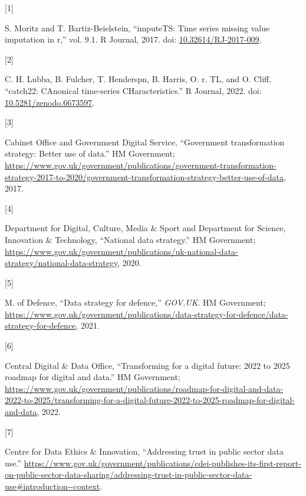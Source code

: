 \documentclass{article}
\newlength{\cslhangindent}
\newlength{\csllabelwidth}
\newlength{\cslentryspacingunit} %
\newenvironment{CSLReferences}[2] %
 {%
  \setlength{\parindent}{0pt}
  \ifodd #1
  \let\oldpar\par
  \def\par{\hangindent=\cslhangindent\oldpar}
  \fi
  \setlength{\parskip}{#2\cslentryspacingunit}
 }%
 {}
\newcommand{\CSLLeftMargin}[1]{\parbox[t]{\csllabelwidth}{#1}}
\newcommand{\CSLRightInline}[1]{\parbox[t]{\linewidth - \csllabelwidth}{#1}\break}
\begin{document}
\hypertarget{refs}{}
\begin{CSLReferences}{0}{0}
\leavevmode{}%
\CSLLeftMargin{{[}1{]} }
\CSLRightInline{S. Moritz and T. Bartiz-Beielstein, {``imputeTS: Time
series missing value imputation in r,''} vol. 9.1. R Journal, 2017. doi:
\href{https://doi.org/10.32614/RJ-2017-009}{10.32614/RJ-2017-009}.}

\leavevmode{}%
\CSLLeftMargin{{[}2{]} }
\CSLRightInline{C. H. Lubba, B. Fulcher, T. Henderspn, B. Harris, O. r.
TL, and O. Cliff, {``catch22: CAnonical time-series CHaracteristics.''}
R Journal, 2022. doi:
\href{https://doi.org/10.5281/zenodo.6673597}{10.5281/zenodo.6673597}.}

\leavevmode{}%
\CSLLeftMargin{{[}3{]} }
\CSLRightInline{Cabinet Office and Government Digital Service,
{``Government transformation strategy: Better use of data.''} HM
Government;
\url{https://www.gov.uk/government/publications/government-transformation-strategy-2017-to-2020/government-transformation-strategy-better-use-of-data},
2017.}

\leavevmode{}%
\CSLLeftMargin{{[}4{]} }
\CSLRightInline{Department for Digital, Culture, Media \& Sport and
Department for Science, Innovation \& Technology, {``National data
strategy.''} HM Government;
\url{https://www.gov.uk/government/publications/uk-national-data-strategy/national-data-strategy},
2020.}

\leavevmode{}%
\CSLLeftMargin{{[}5{]} }
\CSLRightInline{M. of Defence, {``Data strategy for defence,''}
\emph{GOV.UK}. HM Government;
\url{https://www.gov.uk/government/publications/data-strategy-for-defence/data-strategy-for-defence},
2021.}

\leavevmode{}%
\CSLLeftMargin{{[}6{]} }
\CSLRightInline{Central Digital \& Data Office, {``Transforming for a
digital future: 2022 to 2025 roadmap for digital and data.''} HM
Government;
\url{https://www.gov.uk/government/publications/roadmap-for-digital-and-data-2022-to-2025/transforming-for-a-digital-future-2022-to-2025-roadmap-for-digital-and-data},
2022.}

\leavevmode{}%
\CSLLeftMargin{{[}7{]} }
\CSLRightInline{Centre for Data Ethics \& Innovation, {``Addressing
trust in public sector data use.''}
\url{https://www.gov.uk/government/publications/cdei-publishes-its-first-report-on-public-sector-data-sharing/addressing-trust-in-public-sector-data-use\#introduction--context}.}


\end{CSLReferences}
\end{document}
